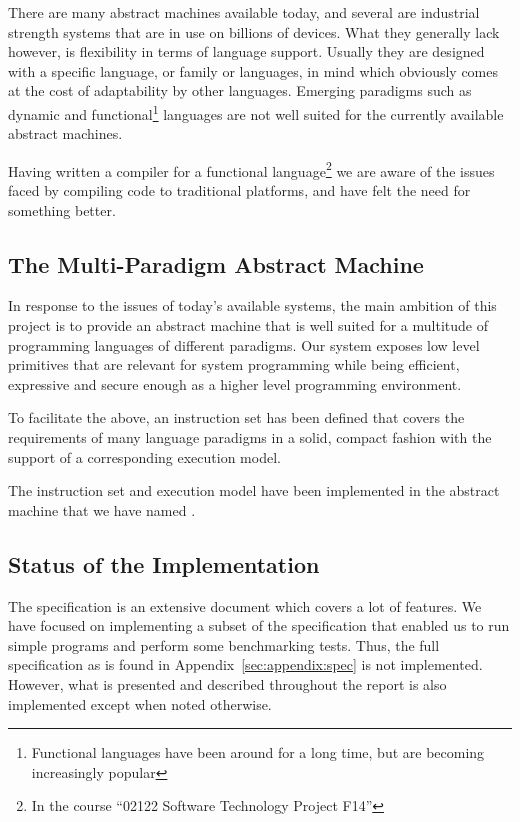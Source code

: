There are many abstract machines available today, and several are industrial
strength systems that are in use on billions of devices. What they generally
lack however, is flexibility in terms of language support. Usually they are
designed with a specific language, or family or languages, in mind which
obviously comes at the cost of adaptability by other languages. Emerging
paradigms such as dynamic and functional\footnote{Functional languages have been
  around for a long time, but are becoming increasingly popular} languages are
not well suited for the currently available abstract machines.

Having written a compiler for a functional language\footnote{In the course
  ``02122 Software Technology Project F14''} we are aware of the issues faced by
compiling code to traditional platforms, and have felt the need for something
better.

\subsection{The Multi-Paradigm Abstract Machine}

In response to the issues of today's available systems, the main ambition of
this project is to provide an abstract machine that is well suited for a
multitude of programming languages of different paradigms. Our system exposes
low level primitives that are relevant for system programming while being
efficient, expressive and secure enough as a higher level programming
environment.

To facilitate the above, an instruction set has been defined that covers the
requirements of many language paradigms in a solid, compact fashion with the
support of a corresponding execution model.

The instruction set and execution model have been implemented in the abstract
machine that we have named \thename{}.

\subsection{Status of the Implementation}

The \thename{} specification is an extensive document which covers a lot of
features. We have focused on implementing a subset of the specification that
enabled us to run simple programs and perform some benchmarking tests. Thus, the
full specification as is found in Appendix~\ref{sec:appendix:spec} is not
implemented. However, what is presented and described throughout the report is
also implemented except when noted otherwise.

